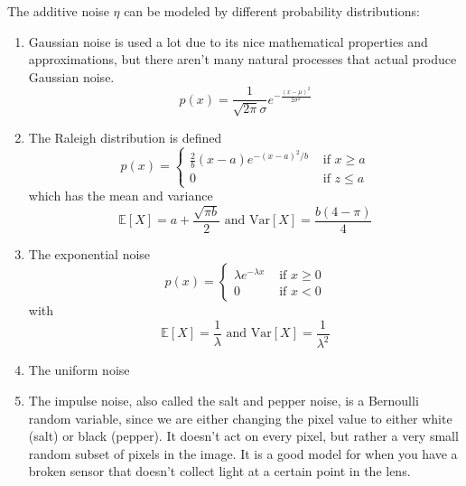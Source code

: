 \documentclass{article}
\begin{document}
    The additive noise $\eta$ can be modeled by different probability distributions: 
    \begin{enumerate}
      \item Gaussian noise is used a lot due to its nice mathematical properties and approximations, but there aren't many natural processes that actual produce Gaussian noise. 
      \begin{equation}
        p(x) = \frac{1}{\sqrt{2 \pi} \sigma} e^{-\frac{(x - \mu)^2}{2 \sigma^2}}
      \end{equation}

      \item The Raleigh distribution is defined 
      \begin{equation}
        p(x) = \begin{cases} \frac{2}{b} (x - a) e^{-(x - a)^2 / b} & \text{ if } x \geq a \\ 0 & \text{ if } z \leq a \end{cases}
      \end{equation}
      which has the mean and variance 
      \begin{equation}
        \mathbb{E}[X] = a + \frac{\sqrt{\pi b}}{2} \text{ and } \mathrm{Var}[X] = \frac{b (4 - \pi)}{4}
      \end{equation}

      \item The exponential noise 
      \begin{equation}
        p(x) = \begin{cases} \lambda e^{-\lambda x} & \text{ if } x \geq 0 \\ 0 & \text{ if } x < 0 \end{cases}
      \end{equation}
      with 
      \begin{equation}
        \mathbb{E}[X] = \frac{1}{\lambda} \text{ and } \mathrm{Var}[X] = \frac{1}{\lambda^2}
      \end{equation}

      \item The uniform noise 
      \item The impulse noise, also called the salt and pepper noise, is a Bernoulli random variable, since we are either changing the pixel value to either white (salt) or black (pepper). It doesn't act on every pixel, but rather a very small random subset of pixels in the image. It is a good model for when you have a broken sensor that doesn't collect light at a certain point in the lens. 
    \end{enumerate}
\end{document}
